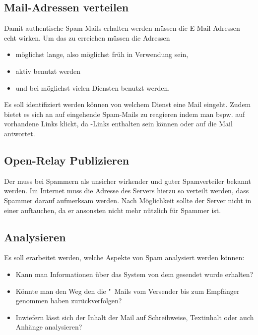 \documentclass[a4paper,11pt,singlespacing]{article}
\begin{document}
	\subsection{Mail-Adressen verteilen}\label{sec:ProblemstellungMailsVerteilen}
		Damit authentische Spam Mails erhalten werden müssen die E-Mail-Adressen echt wirken.
		Um das zu erreichen müssen die Adressen
		\begin{itemize}
		\item möglichst lange, also möglichst früh in Verwendung sein,
		\item aktiv benutzt werden
		\item und bei möglichst vielen Diensten benutzt werden.
		\end{itemize}
		Es soll identifiziert werden können von welchem Dienst eine Mail eingeht.
		Zudem bietet es sich an auf eingehende Spam-Mails zu reagieren indem man bspw. auf vorhandene Links klickt, da -Links enthalten sein können oder auf die Mail antwortet.

	\subsection{Open-Relay Publizieren}\label{sec:ProblemstellungPublizieren}
		Der  muss bei Spammern als unsicher wirkender  und guter Spamverteiler bekannt werden.
		Im Internet muss die Adresse des Servers hierzu so verteilt werden, dass Spammer darauf aufmerksam werden.
		Nach Möglichkeit sollte der Server nicht in einer   auftauchen, da er ansonsten nicht mehr nützlich für Spammer ist.

	\subsection{Analysieren}\label{sec:ProblemstellungAnalysieren}
		Es soll erarbeitet werden, welche Aspekte von Spam analysiert werden können:
		\begin{itemize}
		\item Kann man Informationen über das System von dem gesendet wurde erhalten?
		\item Könnte man den Weg den die "~Mails vom Versender bis zum Empfänger genommen haben zurückverfolgen?
		\item Inwiefern lässt sich der Inhalt der Mail auf Schreibweise, Textinhalt oder auch Anhänge analysieren?
		\end{itemize}
\end{document}
